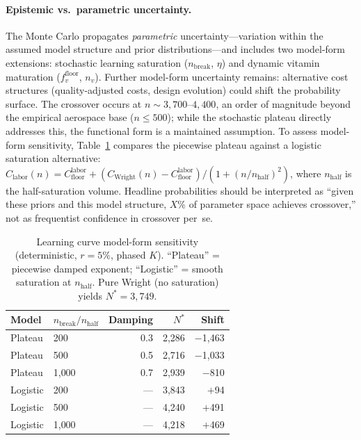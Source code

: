 \documentclass[preprint,12pt]{elsarticle}
\begin{document}
\paragraph{Epistemic vs.\ parametric uncertainty.} The Monte Carlo propagates \emph{parametric} uncertainty---variation within the assumed model structure and prior distributions---and includes two model-form extensions: stochastic learning saturation ($n_{\mathrm{break}}$, $\eta$) and dynamic vitamin maturation ($f_v^{\mathrm{floor}}$, $n_v$). Further model-form uncertainty remains: alternative cost structures (quality-adjusted costs, design evolution) could shift the probability surface. The crossover occurs at $n \sim 3{,}700$--$4{,}400$, an order of magnitude beyond the empirical aerospace base ($n \leq 500$); while the stochastic plateau directly addresses this, the functional form is a maintained assumption. To assess model-form sensitivity, Table~\ref{tab:logistic_comparison} compares the piecewise plateau against a logistic saturation alternative: $C_{\mathrm{labor}}(n) = C_{\mathrm{floor}}^{\mathrm{labor}} + (C_{\mathrm{Wright}}(n) - C_{\mathrm{floor}}^{\mathrm{labor}}) / (1 + (n/n_{\mathrm{half}})^2)$, where $n_{\mathrm{half}}$ is the half-saturation volume. Headline probabilities should be interpreted as ``given these priors and this model structure, $X$\% of parameter space achieves crossover,'' not as frequentist confidence in crossover per~se.

\begin{table}[htbp]
\centering
\caption{Learning curve model-form sensitivity (deterministic, $r = 5\%$, phased $K$). ``Plateau'' = piecewise damped exponent; ``Logistic'' = smooth saturation at $n_{\mathrm{half}}$. Pure Wright (no saturation) yields $N^* = 3{,}749$.}
\label{tab:logistic_comparison}
\small
\begin{tabular}{@{}llrrr@{}}
\toprule
Model & $n_{\mathrm{break}}/n_{\mathrm{half}}$ & Damping & $N^*$ & Shift \\
\midrule
Plateau  & 200   & 0.3 & 2{,}286 & $-$1{,}463 \\
Plateau  & 500   & 0.5 & 2{,}716 & $-$1{,}033 \\
Plateau  & 1{,}000 & 0.7 & 2{,}939 & $-$810 \\
Logistic & 200   & --- & 3{,}843 & $+$94 \\
Logistic & 500   & --- & 4{,}240 & $+$491 \\
Logistic & 1{,}000 & --- & 4{,}218 & $+$469 \\
\bottomrule
\end{tabular}
\end{table}
\end{document}
